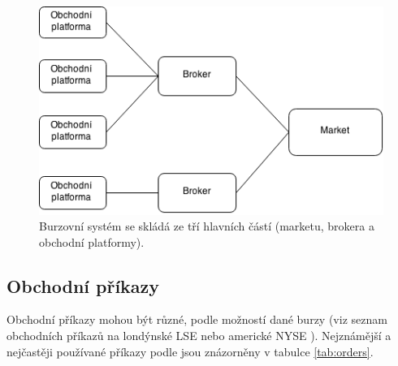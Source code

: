 \documentclass[thesis=M,czech]{FITthesis}[2012/06/26]
\begin{document}
\begin{figure}[h]
	\centering
	\includegraphics[width=1\textwidth]{images/structure}
 	\caption[Struktura burzovního systému]{Burzovní systém se skládá ze tří hlavních částí (marketu, brokera a obchodní platformy).}
 	\label{fig:stock_market_structure} 	
\end{figure}


\subsection{Obchodní příkazy}
\label{sec:orders}
	Obchodní příkazy mohou být různé, podle možností dané burzy (viz seznam obchodních příkazů na londýnské LSE \cite{LSEManual} nebo americké NYSE \cite{NYSEManual}). Nejznámější a nejčastěji používané příkazy podle \cite{NYSEOrderUsage} jsou znázorněny v tabulce \ref{tab:orders}.
\end{document}

